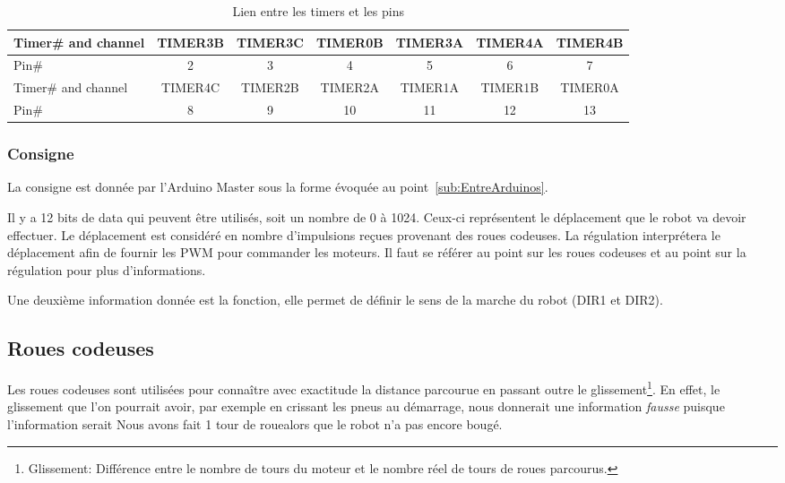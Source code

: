 \begin{table}[!ht]
	\centering
	\begin{tabular}{|l|c|c|c|c|c|c|}
		\hline
		Timer\# and channel & TIMER3B & TIMER3C & TIMER0B & TIMER3A & TIMER4A & TIMER4B \\
		\hline
		Pin\# & 2 & 3 & 4 & 5 & 6 & 7 \\
		\hline
		\hline
		Timer\# and channel & TIMER4C & TIMER2B & TIMER2A & TIMER1A & TIMER1B & TIMER0A \\
		\hline
		Pin\# & 8 & 9 & 10 & 11 & 12 & 13 \\
		\hline
	\end{tabular}
	\caption{Lien entre les timers et les pins}
	\label{tb:LienTimerPin}
\end{table}

\subsubsection{Consigne}
La consigne est donnée par l'Arduino Master sous la forme évoquée au point~\ref{sub:EntreArduinos}. 

\noindent Il y a 12 bits de data qui peuvent être utilisés, soit un nombre de 0 à 1024. Ceux-ci représentent le déplacement que le robot va devoir effectuer. Le déplacement est considéré en nombre d'impulsions reçues provenant des roues codeuses. La régulation interprétera le déplacement afin de fournir les PWM pour commander les moteurs. Il faut se référer au point sur les roues codeuses et au point sur la régulation pour plus d'informations. 

\noindent Une deuxième information donnée est la fonction, elle permet de définir le sens de la marche du robot (DIR1 et DIR2).

\subsection{Roues codeuses}
Les roues codeuses sont utilisées pour connaître avec exactitude la distance parcourue en passant outre le glissement\footnote{Glissement: Différence entre le nombre de tours du moteur et le nombre réel de tours de roues parcourus.}. En effet, le glissement que l'on pourrait avoir, par exemple en crissant les pneus au démarrage, nous donnerait une information \textit{fausse} puisque l'information serait \og Nous avons fait 1 tour de roue\fg alors que le robot n'a pas encore bougé.

